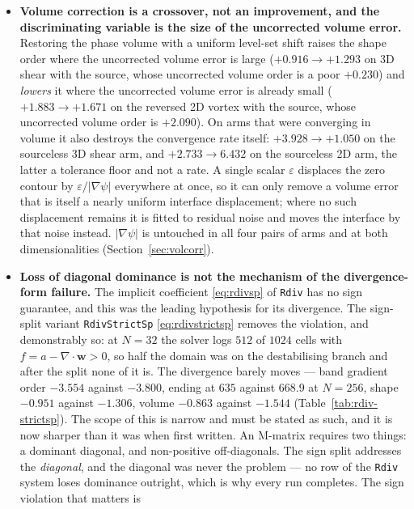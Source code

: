 \documentclass[preprint,3p,11pt]{elsarticle}
\newcommand{\psilev}{\psi}
\newcommand{\gradpsi}{\lvert\nabla\psilev\rvert}
\begin{document}
\begin{itemize}
    source whose purpose is to cancel a term rather than to evolve one.
  \item \textbf{Volume correction is a crossover, not an improvement, and the
    discriminating variable is the size of the uncorrected volume error.}
    Restoring the phase volume with a uniform level-set shift raises the shape
    order where the uncorrected volume error is large ($+0.916 \rightarrow
    +1.293$ on 3D shear with the source, whose uncorrected volume order is a poor
    $+0.230$) and \emph{lowers} it where the uncorrected volume error is already
    small ($+1.883 \rightarrow +1.671$ on the reversed 2D vortex with the source,
    whose uncorrected volume order is $+2.090$). On arms that were converging in
    volume it also destroys the convergence rate itself: $+3.928 \rightarrow
    +1.050$ on the sourceless 3D shear arm, and $+2.733 \rightarrow 6.432$ on the
    sourceless 2D arm, the latter a tolerance floor and not a rate. A single
    scalar $\varepsilon$ displaces the zero contour by $\varepsilon/\gradpsi$
    everywhere at once, so it can only remove a volume error that is itself a
    nearly uniform interface displacement; where no such displacement remains it
    is fitted to residual noise and moves the interface by that noise instead.
    $\gradpsi$ is untouched in all four pairs of arms and at both
    dimensionalities (Section~\ref{sec:volcorr}).
  \item \textbf{Loss of diagonal dominance is not the mechanism of the
    divergence-form failure.} The implicit coefficient \eqref{eq:rdivsp} of
    \texttt{Rdiv} has no sign guarantee, and this was the leading hypothesis for
    its divergence. The sign-split variant \texttt{RdivStrictSp}
    \eqref{eq:rdivstrictsp} removes the violation, and demonstrably so: at $N=32$
    the solver logs $512$ of $1024$ cells with $f = a - \nabla\cdot\mathbf{w} >
    0$, so half the domain was on the destabilising branch and after the split
    none of it is. The divergence barely moves --- band gradient order $-3.554$
    against $-3.800$, ending at $635$ against $668.9$ at $N=256$, shape $-0.951$
    against $-1.306$, volume $-0.863$ against $-1.544$
    (Table~\ref{tab:rdiv-strictsp}). The scope of this is narrow and must be
    stated as such, and it is now sharper than it was when first written. An
    M-matrix requires two things: a dominant diagonal, and non-positive
    off-diagonals. The sign split addresses the \emph{diagonal}, and the diagonal
    was never the problem --- no row of the \texttt{Rdiv} system loses dominance
    outright, which is why every run completes. The sign violation that matters is

\end{itemize}
\end{document}
